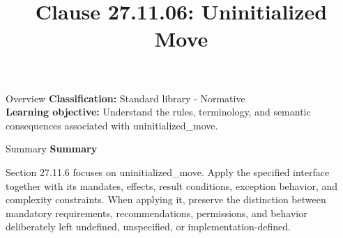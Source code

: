 \documentclass[10pt,letterpaper]{article}
\title{Clause 27.11.06: Uninitialized Move}
\author{}
\date{}
\begin{document}
\maketitle
\begin{CornellOverviewBox}{Overview}
\textbf{Classification:} Standard library - Normative\\[2pt]
\textbf{Learning objective:} Understand the rules, terminology, and semantic consequences associated with uninitialized\_move.
\end{CornellOverviewBox}\begin{CornellSummaryBox}{Summary}
{\sffamily\bfseries\color{Accent} Summary}\par\vspace{3pt}Section 27.11.6 focuses on uninitialized\_move. Apply the specified interface together with its mandates, effects, result conditions, exception behavior, and complexity constraints. When applying it, preserve the distinction between mandatory requirements, recommendations, permissions, and behavior deliberately left undefined, unspecified, or implementation-defined.
\end{CornellSummaryBox}
\end{document}
